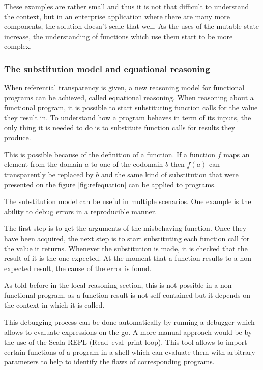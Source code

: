 \documentclass[../main.tex]{subfiles}
\begin{document}


These examples are rather small and thus it is not that difficult to understand
the context, but in an enterprise application where there are many more
components, the solution doesn't scale that well. As the uses of the mutable
state increase, the understanding of functions which use them start to be more
complex.

\subsubsection{The substitution model and equational reasoning}

When referential transparency is given, a new reasoning model for functional
programs can be achieved, called equational reasoning. When reasoning about a
functional program, it is possible to start substituting function calls for the
value they result in. To understand how a program behaves in term of its inputs,
the only thing it is needed to do is to substitute function calls for results they
produce.

This is possible because of the definition of a function. If a function $f$ maps an
element from the domain $a$ to one of the codomain $b$ then $f(a)$ can
transparently be replaced by $b$ and the same kind of substitution that were
presented on the figure \ref{fig:refequation} can be applied to programs.

The substitution model can be useful in multiple scenarios. One example is the
ability to debug errors in a reproducible manner.

The first step is to get the arguments of the misbehaving function. Once they have been acquired, the next step is to
start substituting each function call for the value it returns. Whenever the
substitution is made, it is checked that the result of it is the one expected. At the
moment that a function results to a non expected result, the cause of the error
is found.

As told before in the local reasoning section, this is not possible in a non
functional program, as a function result is not self contained but it depends on
the context in which it is called.

This debugging process can be done automatically by running a debugger which allows to
evaluate expressions on the go. A more manual approach would be by the use of
the Scala REPL (Read–eval–print loop). This tool allows to import
certain functions of a program in a shell which can evaluate them with arbitrary
parameters to help to identify the flaws of corresponding programs.
\end{document}
